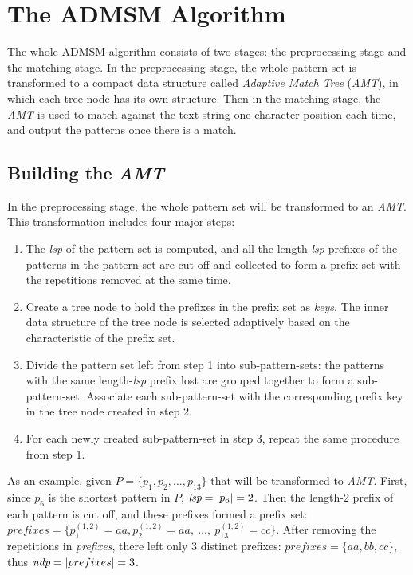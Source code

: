 \documentclass[a4paper]{article}
\begin{document}
\section{The ADMSM Algorithm}
\label{sec:am}

The whole ADMSM algorithm consists of two stages: the preprocessing
stage and the matching stage. In the preprocessing stage, the whole
pattern set is transformed to a compact data structure called
\emph{Adaptive Match Tree} (\emph{AMT}), in which each tree node has
its own structure. Then in the matching stage, the \emph{AMT} is used
to match against the text string one character position each time, and
output the patterns once there is a match.

\subsection{Building the \emph{AMT}}
\label{sec:pp}


In the preprocessing stage, the whole pattern set will be transformed
to an \emph{AMT}. This transformation includes four major steps:

\begin{enumerate}
\item The \emph{lsp} of the pattern set is computed, and all the
length-\emph{lsp} prefixes of the patterns in the pattern set are cut
off and collected to form a prefix set with the repetitions removed at
the same time.
\item Create a tree node to hold the prefixes in the prefix set as
\emph{keys}. The inner data structure of the tree node is selected
adaptively based on the characteristic of the prefix set.
\item Divide the pattern set left from step 1 into sub-pattern-sets:
the patterns with the same length-\emph{lsp} prefix lost are grouped
together to form a sub-pattern-set. Associate each sub-pattern-set
with the corresponding prefix key in the tree node created in step 2.
\item For each newly created sub-pattern-set in step 3, repeat the
same procedure from step 1.
\end{enumerate}

As an example, given $P = \{p_1, p_2, \dots, p_{13}\}$ that will be
transformed to \emph{AMT}.  First, since $p_6$ is the shortest pattern
in $P$, $\emph{lsp} = |p_6| = 2$. Then the length-2 prefix of each
pattern is cut off, and these prefixes formed a prefix set: $prefixes
= \{p_1^{(1,2)} = aa, p_2^{(1,2)} = aa, \ \dots, \ p_{13}^{(1,2)} =
cc\}$.  After removing the repetitions in \emph{prefixes}, there left
only 3 distinct prefixes: $prefixes = \{aa, bb, cc\}$, thus
$\emph{ndp} = |prefixes| = 3$.
\end{document}
